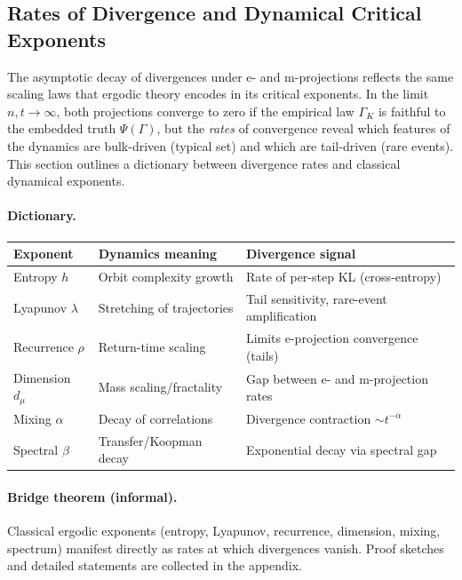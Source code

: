\documentclass[11pt]{article}
\newcommand{\1}{\mathbf{1}}
\begin{document}
\subsection{Rates of Divergence and Dynamical Critical Exponents}

The asymptotic decay of divergences under e- and m-projections reflects the same scaling laws that ergodic theory encodes in its critical exponents. In the limit $n,t\to\infty$, both projections converge to zero if the empirical law $\Gamma_K$ is faithful to the embedded truth $\Psi(\Gamma)$, but the \emph{rates} of convergence reveal which features of the dynamics are bulk-driven (typical set) and which are tail-driven (rare events). This section outlines a dictionary between divergence rates and classical dynamical exponents.

\paragraph{Dictionary.}
\begin{center}
\begin{tabular}{|l|l|l|}
\hline
\textbf{Exponent} & \textbf{Dynamics meaning} & \textbf{Divergence signal} \\
\hline
Entropy $h$ & Orbit complexity growth & Rate of per-step KL (cross-entropy) \\
Lyapunov $\lambda$ & Stretching of trajectories & Tail sensitivity, rare-event amplification \\
Recurrence $\rho$ & Return-time scaling & Limits e-projection convergence (tails) \\
Dimension $d_\mu$ & Mass scaling/fractality & Gap between e- and m-projection rates \\
Mixing $\alpha$ & Decay of correlations & Divergence contraction $\sim t^{-\alpha}$ \\
Spectral $\beta$ & Transfer/Koopman decay & Exponential decay via spectral gap \\
\hline
\end{tabular}
\end{center}


\paragraph{Bridge theorem (informal).}
Classical ergodic exponents (entropy, Lyapunov, recurrence, dimension, mixing, spectrum)
manifest directly as rates at which divergences vanish.
Proof sketches and detailed statements are collected in the appendix.
\end{document}
